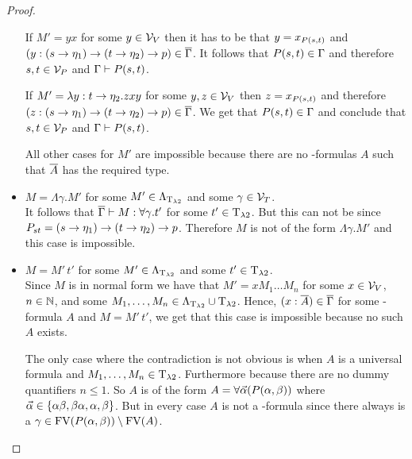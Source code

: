 \begin{proof}
\begin{itemize}
		If $M'=yx$ for some $y\in\mathcal{V}_V$ then it has to be that $y=x_{P(\predTFst,\predTSnd)}$ and $(y:(\predTFst\to \eta_1)\to(\predTSnd\to \eta_2)\to p)\in\trans{\Gamma}$. It follows that $P(\predTFst,\predTSnd)\in\Gamma$ and therefore $\predTFst,\predTSnd\in\VarP$ and $\Gamma\PModels P(\predTFst,\predTSnd)$.
		
		If $M'=\lambda y:\predTSnd\to \eta_2.zxy$ for some $y,z\in\mathcal{V}_V$ then $z=x_{P(\predTFst,\predTSnd)}$ and therefore $(z:(\predTFst\to \eta_1)\to(\predTSnd\to \eta_2)\to p)\in\trans{\Gamma}$. We get that $P(\predTFst,\predTSnd)\in\Gamma$ and conclude that $\predTFst,\predTSnd\in\VarP$ and $\Gamma\PModels P(\predTFst,\predTSnd)$.
		
		All other cases for $M'$ are impossible because there are no \SysP-formulas $A$ such that $\overline{A}$ has the required type. 
	\item[] \underline{$M=\Lambda\gamma.M'$} for some $M'\in\Lambda_{\text{T}_{\lambda2}}$ and some $\gamma\in\mathcal{V}_T$.\\ %
		It follows that $\overline{\Gamma}\vdash M:\forall\gamma.t'$ for some $t'\in\text{T}_{\lambda2}$.
		But this can not be since $\code{P}{\predTFst}{\predTSnd}=(\predTFst\to \eta_1)\to(\predTSnd\to \eta_2)\to p$. Therefore $M$ is not of the form $\Lambda\gamma.M'$ and this case is impossible.

	\item[] \underline{$M=M'\,t'$} for some $M'\in\Lambda_{\text{T}_{\lambda2}}$ and some $t'\in\text{T}_{\lambda2}$.\\
		Since $M$ is in normal form we have that $M'=xM_1\dots M_n$ for some $x\in\mathcal{V}_V$, $n\in\mathbb{N}$, and some $M_1,\dots,M_n\in\Lambda_{\text{T}_{\lambda2}}\cup\text{T}_{\lambda2}$.
		Hence, $(x:\overline{A})\in\overline{\Gamma}$ for some \SysP-formula $A$ and $M=M'\,t'$, we get that this case is impossible because no such $A$ exists.
		
		The only case where the contradiction is not obvious is when $A$ is a universal formula and $M_1,\dots,M_n\in\text{T}_{\lambda2}$. Furthermore because there are no dummy quantifiers $n\leq1$. So $A$ is of the form $A=\forall\predVec(P(\predFst,\predSnd))$ where $\predVec\in\{\predFst\predSnd,\predSnd\predFst,\predFst,\predSnd\}$.
		But in every case $A$ is not a \SysP-formula since there always is a $\gamma\in\FV(P(\predFst,\predSnd))\setminus\FV(A)$.
		
\end{itemize}
\end{proof}

